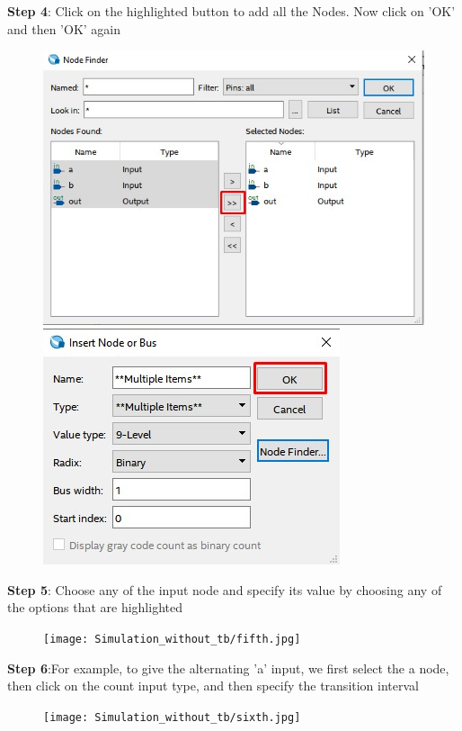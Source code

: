 \documentclass[12pt,singleside,a4paper]{article}
\begin{document}
\noindent \textbf{Step 4}: Click on the highlighted button to add all the Nodes. Now click on 'OK' and then 'OK' \hspace*{37pt} again
\begin{figure}[H]
\centering
\includegraphics[scale=0.7]{Simulation_without_tb/fourth.jpg}\includegraphics[scale=0.7]{Simulation_without_tb/fourth_1.jpg}
\end{figure}

\newpage
\noindent \textbf{Step 5}: Choose any of the input node and specify its value by choosing any of the options that \hspace*{39pt}are highlighted
\begin{figure}[H]
\centering
\texttt{[image: Simulation\_without\_tb/fifth.jpg]}
\end{figure}

\noindent \textbf{Step 6}:For example, to give the alternating 'a' input, we first select the a node, then click on the \hspace*{35pt} count input type, and then specify the transition interval
\begin{figure}[H]
\centering
\texttt{[image: Simulation\_without\_tb/sixth.jpg]}
\end{figure}
\end{document}
